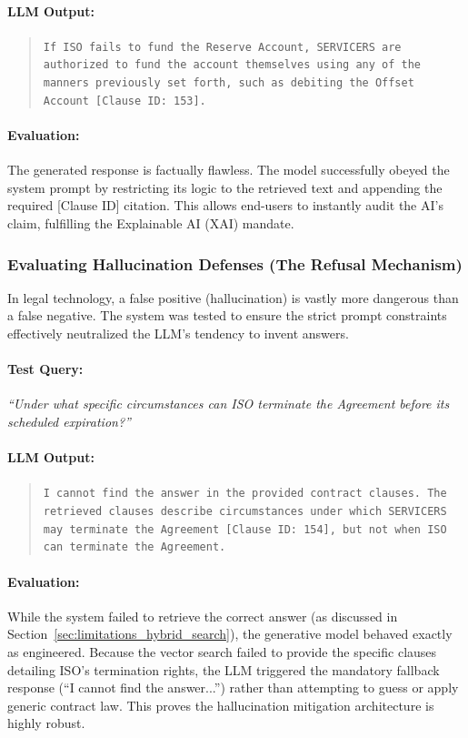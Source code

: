 \documentclass[twoside,final]{hcmut-report}
\begin{document}
\paragraph{LLM Output:}
\begin{quote}
  \texttt{If ISO fails to fund the Reserve Account, SERVICERS are authorized to fund the account themselves using any of the manners previously set forth, such as debiting the Offset Account [Clause ID: 153].}
\end{quote}

\paragraph{Evaluation:} The generated response is factually flawless. The model successfully obeyed the system prompt by restricting its logic to the retrieved text and appending the required [Clause ID] citation. This allows end-users to instantly audit the AI's claim, fulfilling the Explainable AI (XAI) mandate.

\subsubsection{Evaluating Hallucination Defenses (The Refusal Mechanism)}

In legal technology, a false positive (hallucination) is vastly more dangerous than a false negative. The system was tested to ensure the strict prompt constraints effectively neutralized the LLM's tendency to invent answers.

\paragraph{Test Query:} \emph{``Under what specific circumstances can ISO terminate the Agreement before its scheduled expiration?''}

\paragraph{LLM Output:}
\begin{quote}
  \texttt{I cannot find the answer in the provided contract clauses. The retrieved clauses describe circumstances under which SERVICERS may terminate the Agreement [Clause ID: 154], but not when ISO can terminate the Agreement.}
\end{quote}

\paragraph{Evaluation:} While the system failed to retrieve the correct answer (as discussed in Section~\ref{sec:limitations_hybrid_search}), the generative model behaved exactly as engineered. Because the vector search failed to provide the specific clauses detailing ISO's termination rights, the LLM triggered the mandatory fallback response (``I cannot find the answer...'') rather than attempting to guess or apply generic contract law. This proves the hallucination mitigation architecture is highly robust.
\end{document}
